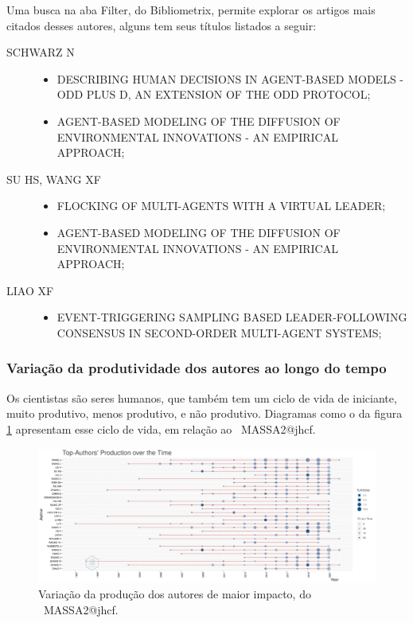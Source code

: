 Uma busca na aba Filter, do Bibliometrix, permite explorar os artigos mais citados desses autores, alguns tem seus títulos listados a seguir:
\begin{description}
    \item [SCHWARZ N] 
    \begin{itemize}
        \item DESCRIBING HUMAN DECISIONS IN AGENT-BASED MODELS - ODD PLUS D, AN EXTENSION OF THE ODD PROTOCOL;
        \item AGENT-BASED MODELING OF THE DIFFUSION OF ENVIRONMENTAL INNOVATIONS - AN EMPIRICAL APPROACH;
    \end{itemize}
    \item [SU HS, WANG XF] 
    \begin{itemize}
        \item FLOCKING OF MULTI-AGENTS WITH A VIRTUAL LEADER;
        \item AGENT-BASED MODELING OF THE DIFFUSION OF ENVIRONMENTAL INNOVATIONS - AN EMPIRICAL APPROACH;
    \end{itemize}
    \item [LIAO XF] 
    \begin{itemize}
        \item EVENT-TRIGGERING SAMPLING BASED LEADER-FOLLOWING CONSENSUS IN SECOND-ORDER MULTI-AGENT SYSTEMS;
    \end{itemize}    
\end{description}

\subsubsection{Variação da produtividade dos autores ao longo do tempo}

Os cientistas são seres humanos, que também tem um ciclo de vida de iniciante, muito produtivo, menos produtivo, e não produtivo.
Diagramas como o da figura \ref{fig:MASSA2-TopAuthorsProductionOverTime} apresentam esse ciclo de vida, em relação ao \dataset\ MASSA2@jhcf.

\begin{figure}
    \centering
    \includegraphics[angle=90,width=1\textwidth,height=0.93\textheight]{exploratory-data-analysis/jhcf/PesqBibliogr/SimulacaoMultiagente/WoS-20220203/Metricas/Authors/MASSA2-TopAuthorsProductionOverTime.png}
    \caption{Variação da produção dos autores de maior impacto, do \dataset\ MASSA2@jhcf.}
    \label{fig:MASSA2-TopAuthorsProductionOverTime}
\end{figure}

